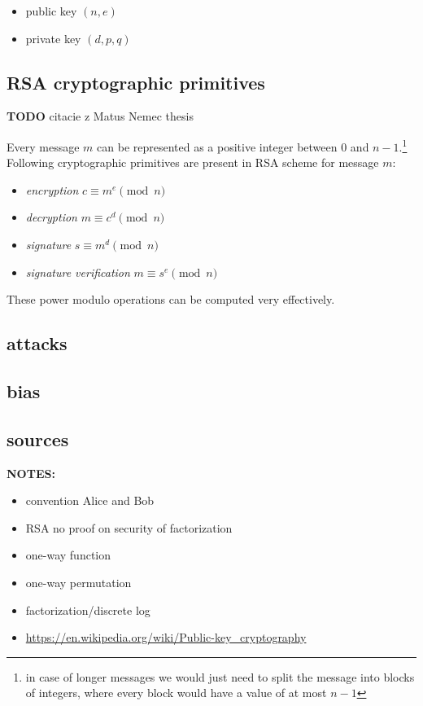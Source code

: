 \begin{itemize}

\item public key $(n, e)$

\item private key $(d, p, q)$

\end{itemize}

\subsection*{RSA cryptographic primitives}

\textbf{TODO } citacie z Matus Nemec thesis

Every message $m$ can be represented as a positive integer between 0 and $n-1$.\footnote{in case of longer messages we would just need to split the message into blocks of integers, where every block would have a value of at most $n-1$} Following cryptographic primitives are present in RSA scheme for message $m$:

\begin{itemize}

\item \textit{encryption} $c \equiv m^e \pmod{n}$
\item \textit{decryption} $m \equiv c^d \pmod{n}$
\item \textit{signature} $s \equiv m^d \pmod{n}$
\item \textit{signature verification} $m \equiv s^e \pmod{n}$

\end{itemize}

These power modulo operations can be computed very effectively.

\subsection*{attacks}
\subsection*{bias}
\subsection*{sources}


\textbf{NOTES:}
\begin{itemize}
\item convention Alice and Bob
\item RSA no proof on security of factorization
\item one-way function
\item one-way permutation
\item factorization/discrete log
\item \url{https://en.wikipedia.org/wiki/Public-key_cryptography}
\end{itemize}
